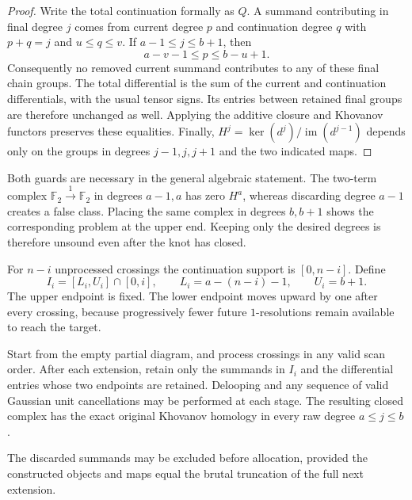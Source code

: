\begin{proof}
Write the total continuation formally as $Q$.  A summand contributing in
final degree $j$ comes from current degree $p$ and continuation degree $q$
with $p+q=j$ and $u\leq q\leq v$.  If $a-1\leq j\leq b+1$, then
\[
 a-v-1\leq p\leq b-u+1.
\]
Consequently no removed current summand contributes to any of these final
chain groups.  The total differential is the sum of the current and
continuation differentials, with the usual tensor signs.  Its entries
between retained final groups are therefore unchanged as well.  Applying
the additive closure and Khovanov functors preserves these equalities.
Finally,
$H^j=\ker(d^j)/\operatorname{im}(d^{j-1})$ depends only on the groups in
degrees $j-1,j,j+1$ and the two indicated maps.
\end{proof}

Both guards are necessary in the general algebraic statement.  The
two-term complex $\mathbb F_2\xrightarrow{1}\mathbb F_2$ in degrees
$a-1,a$ has zero $H^a$, whereas discarding degree $a-1$ creates a false
class.  Placing the same complex in degrees $b,b+1$ shows the corresponding
problem at the upper end.  Keeping only the desired degrees is therefore
unsound even after the knot has closed.

For $n-i$ unprocessed crossings the continuation support is $[0,n-i]$.
Define
\begin{equation}
 I_i=[L_i,U_i]\cap[0,i],\qquad
 L_i=a-(n-i)-1,\qquad U_i=b+1.
 \label{eq:moving-window}
\end{equation}
The upper endpoint is fixed.  The lower endpoint moves upward by one after
every crossing, because progressively fewer future $1$-resolutions remain
available to reach the target.

\begin{theorem}
\label{thm:window-correctness}
Start from the empty partial diagram, and process crossings in any valid
scan order.  After each extension, retain only the summands in $I_i$ and
the differential entries whose two endpoints are retained.  Delooping and
any sequence of valid Gaussian unit cancellations may be performed at each
stage.  The resulting closed complex has the exact original Khovanov
homology in every raw degree $a\leq j\leq b$.

The discarded summands may be excluded before allocation, provided the
constructed objects and maps equal the brutal truncation of the full next
extension.
\end{theorem}

